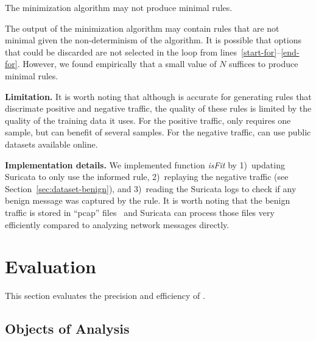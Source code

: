 \documentclass[sigconf,anonymous]{acmart}
\begin{document}
\begin{proposition}
  The minimization algorithm may not produce minimal rules.
\end{proposition}

The output of the minimization algorithm may contain rules that are
not minimal given the non-determinism of the algorithm. It is possible
that options that could be discarded are not selected in the loop from
lines~\ref{start-for}--\ref{end-for}. However, we found empirically
that a small value of $N$ suffices to produce minimal rules.


\vspace{2ex}
\noindent\textbf{Limitation.} It is worth noting that although
\tname{} is accurate for generating rules that discrimate positive and
negative traffic, the quality of these rules is limited by the quality
of the training data it uses. For the positive traffic, \tname{} only
requires one sample, but can benefit of several samples. For the
negative traffic, \tname{} can use public datasets available online.

\vspace{2ex}
\noindent\textbf{Implementation details.} We implemented function
\emph{isFit} by 1)~updating Suricata to only use the informed rule,
2)~replaying the negative traffic (see
Section~\ref{sec:dataset-benign}), and 3)~reading the Suricata logs to
check if any benign message was captured by the rule. It is worth
noting that the benign traffic is stored in ``pcap'' files~\cite{pcap}
and Suricata can process those files very efficiently compared to
analyzing network messages directly.

\section{Evaluation}

This section evaluates the precision and efficiency of \tname{}.

\subsection{Objects of Analysis}
\end{document}
